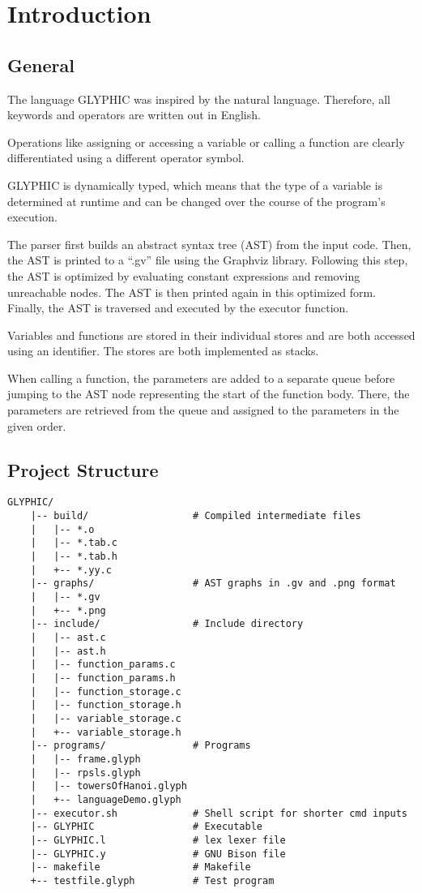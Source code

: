 \chapter{Introduction}
\section{General}
The language GLYPHIC was inspired by the natural language. Therefore, all keywords and operators are written out in English.

Operations like assigning or accessing a variable or calling a function are clearly differentiated using a different operator symbol.

GLYPHIC is dynamically typed, which means that the type of a variable is determined at runtime and can be changed over the course of the program's execution.

The parser first builds an abstract syntax tree (AST) from the input code. Then, the AST is printed to a \enquote{.gv} file using the Graphviz library. Following this step, the AST is optimized by evaluating constant expressions and removing unreachable nodes. The AST is then printed again in this optimized form. Finally, the AST is traversed and executed by the executor function.

Variables and functions are stored in their individual stores and are both accessed using an identifier. The stores are both implemented as stacks.

When calling a function, the parameters are added to a separate queue before jumping to the AST node representing the start of the function body. There, the parameters are retrieved from the queue and assigned to the parameters in the given order.

\pagebreak

\section{Project Structure}
\begin{Verbatim}[commandchars=none, frame=single]
GLYPHIC/
    |-- build/                  # Compiled intermediate files
    |   |-- *.o
    |   |-- *.tab.c
    |   |-- *.tab.h
    |   +-- *.yy.c
    |-- graphs/                 # AST graphs in .gv and .png format
    |   |-- *.gv
    |   +-- *.png
    |-- include/                # Include directory
    |   |-- ast.c
    |   |-- ast.h
    |   |-- function_params.c
    |   |-- function_params.h
    |   |-- function_storage.c
    |   |-- function_storage.h
    |   |-- variable_storage.c
    |   +-- variable_storage.h
    |-- programs/               # Programs
    |   |-- frame.glyph
    |   |-- rpsls.glyph
    |   |-- towersOfHanoi.glyph
    |   +-- languageDemo.glyph
    |-- executor.sh             # Shell script for shorter cmd inputs
    |-- GLYPHIC                 # Executable
    |-- GLYPHIC.l               # lex lexer file
    |-- GLYPHIC.y               # GNU Bison file
    |-- makefile                # Makefile
    +-- testfile.glyph          # Test program
\end{Verbatim}

